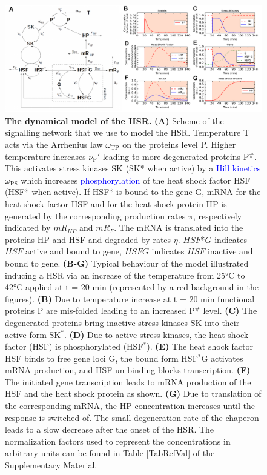 \documentclass[oneside, 10pt, a4paper, twocolumn]{article}
\begin{document}
\begin{figure}
\centering
\includegraphics[width=\textwidth]{Figure1_Paper.pdf}
\caption{\small{\textbf{The dynamical model of the HSR.} \textbf{(A)} Scheme of the signalling network that we use to model the HSR. Temperature T acts via %
the Arrhenius law $\omega_\text{TP}$ on the proteins level P. 
Higher temperature increases $\nu_\text{P}'$ leading to more degenerated proteins P$^\#$. 
This activates stress kinases SK (SK* when active) by a \textcolor{blue}{Hill kinetics} $\omega_\text{PS}$ which increases \textcolor{blue}{phosphorylation} of the heat shock factor HSF (HSF* when active). 
If HSF* is bound to the gene G, mRNA for the heat shock factor HSF and for the heat shock protein HP is generated by the corresponding production rates $\pi$, respectively indicated by $mR_{HP}$ and $mR_{F}$. 
The mRNA is translated into the proteins HP and HSF and degraded by rates $\eta$. $HSF$*$G$ indicates $HSF$ active and bound to gene, $HSFG$ indicates $HSF$ inactive and bound to gene. \textbf{(B-G)} Typical behaviour of the model illustrated inducing a HSR via an increase of the temperature from 25°C to 42°C applied at t = 20 min (represented by a red background in the figures). \textbf{(B)} Due to temperature increase at t = 20 min functional proteins P are mis-folded leading to an increased P$^\#$ level. \textbf{(C)} The degenerated proteins bring inactive stress kinases SK into their active form SK$^*$. \textbf{(D)} Due to active stress kinases, the heat shock factor (HSF) is phosphorylated (HSF$^*$). \textbf{(E)} The heat shock factor HSF binds to free gene loci G, the bound form HSF$^*$G activates mRNA production, and HSF un-binding blocks transcription. \textbf{(F)} The initiated gene transcription leads to mRNA production of the HSF and the heat shock protein as shown. \textbf{(G)} Due to translation of the corresponding mRNA, the HP concentration increases until the response is switched of. The small degeneration rate of the chaperon leads to a slow decrease after the onset of the HSR.
The normalization factors used to represent the concentrations in arbitrary units can be found in Table \ref{TabRefVal} of the Supplementary Material.}}
  \label{Figure1label}
\end{figure}
\end{document}
